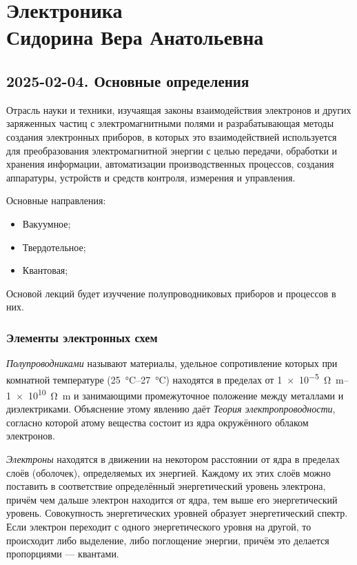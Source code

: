 \part[Электроника]{
Электроника \\
{\Large Сидорина Вера Анатольевна}
}

\chapter{2025-02-04. Основные определения}

\begin{definition}[Электроника]
	Отрасль науки и техники, изучаящая законы взаимодействия электронов и других
	заряженных частиц с электромагнитными полями и разрабатывающая  методы
	создания электронных приборов, в которых это взаимодействией используется для
	преобразования электромагнитной энергии с целью передачи, обработки и хранения
	информации, автоматизации производственных процессов, создания аппаратуры,
	устройств и средств контроля, измерения и управления.
\end{definition}

Основные направления:
\begin{itemize}
	\item Вакуумное;
	\item Твердотельное;
	\item Квантовая;
\end{itemize}

Основой лекций будет изуччение полупроводниковых приборов и процессов в них.

\section{Элементы электронных схем}

\emph{Полупроводниками} называют материалы, удельное сопротивление которых при
комнатной температуре (\qtyrange{25}{27}{\degreeCelsius}) находятся в пределах
от \qtyrange{1e-5}{1e10}{\ohm\meter} и занимающими промежуточное положение между
металлами и диэлектриками. Объяснение этому явлению даёт \emph{Теория
	электропроводности}, согласно которой атому вещества состоит из ядра окружённого
облаком электронов.

\emph{Электроны} находятся в движении на некотором расстоянии от ядра в пределах
слоёв (оболочек), определяемых их энергией. Каждому их этих слоёв можно
поставить в соответствие определённый энергетический уровень электрона, причём
чем дальше электрон находится от ядра, тем выше его энергетический уровень.
Совокупность энергетических уровней образует энергетический спектр. Если
электрон переходит с одного энергетического уровня на другой, то происходит либо
выделение, либо поглощение энергии, причём это делается пропорциями ---
квантами.

